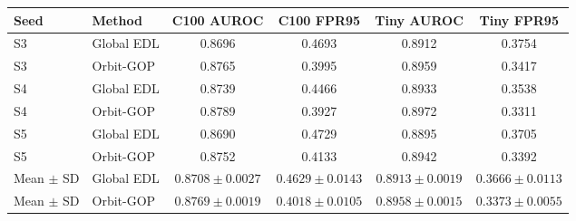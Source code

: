 \begingroup
\footnotesize
\setlength{\tabcolsep}{3pt}
\renewcommand{\arraystretch}{1.1}
\begin{longtable}{@{}llcccc@{}}
\toprule
Seed & Method & C100 AUROC & C100 FPR95 & Tiny AUROC & Tiny FPR95 \\
\midrule
\endhead
\bottomrule
\endlastfoot
S3 & Global EDL & 0.8696 & 0.4693 & 0.8912 & 0.3754 \\
S3 & Orbit-GOP & 0.8765 & 0.3995 & 0.8959 & 0.3417 \\
S4 & Global EDL & 0.8739 & 0.4466 & 0.8933 & 0.3538 \\
S4 & Orbit-GOP & 0.8789 & 0.3927 & 0.8972 & 0.3311 \\
S5 & Global EDL & 0.8690 & 0.4729 & 0.8895 & 0.3705 \\
S5 & Orbit-GOP & 0.8752 & 0.4133 & 0.8942 & 0.3392 \\
Mean $\pm$ SD & Global EDL & $0.8708 \pm 0.0027$ & $0.4629 \pm 0.0143$ & $0.8913 \pm 0.0019$ & $0.3666 \pm 0.0113$ \\
Mean $\pm$ SD & Orbit-GOP & $0.8769 \pm 0.0019$ & $0.4018 \pm 0.0105$ & $0.8958 \pm 0.0015$ & $0.3373 \pm 0.0055$ \\
\end{longtable}
\endgroup

